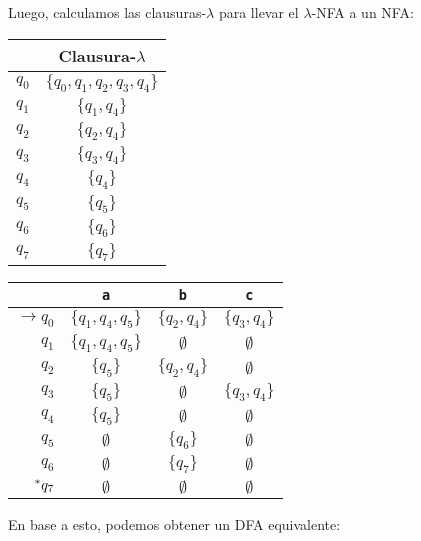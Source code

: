 \documentclass[spanish]{article}
\newcommand{\emptystr}{\lambda}
\begin{document}
Luego, calculamos las clausuras-$\emptystr$ para llevar el $\emptystr$-NFA a un
NFA:\@

\begin{center}
\begin{tabular}{rc}
  & Clausura-$\emptystr$  \\
  \toprule
  $q_0$ & $\{q_0, q_1, q_2, q_3, q_4\}$ \\
  $q_1$ & $\{q_1, q_4\}$ \\
  $q_2$ & $\{q_2, q_4\}$\\
  $q_3$ & $\{q_3, q_4\}$\\
  $q_4$ & $\{q_4\}$\\
  $q_5$ & $\{q_5\}$\\
  $q_6$ & $\{q_6\}$\\
  $q_7$ & $\{q_7\}$
\end{tabular}
\hfill
\begin{tabular}{rccc}
  & {\tt a} & {\tt b} & {\tt c} \\
  \toprule
  $\to q_0$ & $\{q_1, q_4, q_5\}$ & $\{q_2, q_4\}$ & $\{q_3, q_4\}$ \\
  $q_1$ & $\{q_1, q_4, q_5\}$ & $\emptyset$ & $\emptyset$\\
  $q_2$ & $\{q_5\}$ & $\{q_2, q_4\}$ & $\emptyset$\\
  $q_3$ & $\{q_5\}$ & $\emptyset$ & $\{q_3, q_4\}$ \\
  $q_4$ & $\{q_5\}$ & $\emptyset$  & $\emptyset$\\
  $q_5$ & $\emptyset$ & $\{q_6\}$ & $\emptyset$\\
  $q_6$ & $\emptyset$ & $\{q_7\}$ & $\emptyset$\\
  $\prescript{*}{}{q_7}$ & $\emptyset$ & $\emptyset$ & $\emptyset$
\end{tabular}
\end{center}

En base a esto, podemos obtener un DFA equivalente:
\end{document}
